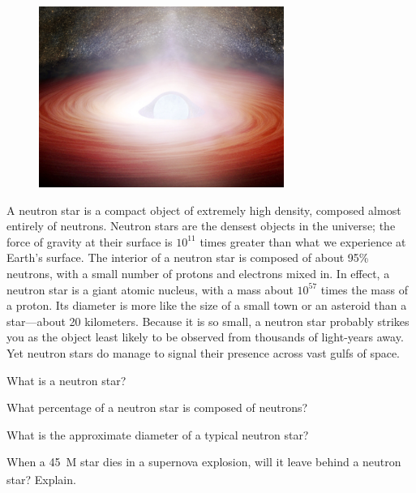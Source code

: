\documentclass{article}
\numberwithin{equation}{section}
\numberwithin{figure}{section}
\begin{document}
\begin{figure}[h!]
    \centering
    \includegraphics[width=8cm]{Figures/Neutron_Star_simulation.png}
\end{figure}

A \gls{neutron star} is a compact object of extremely high density, composed almost entirely of neutrons. Neutron stars are the densest objects in the universe; the force of gravity at their surface is $10^{11}$ times greater than what we experience at Earth's surface. The interior of a neutron star is composed of about 95\% neutrons, with a small number of protons and electrons mixed in. In effect, a neutron star is a giant atomic nucleus, with a mass about $10^{57}$ times the mass of a proton. Its diameter is more like the size of a small town or an asteroid than a star---about 20 kilometers. Because it is so small, a neutron star probably strikes you as the object least likely to be observed from thousands of light-years away. Yet neutron stars do manage to signal their presence across vast gulfs of space.
\vspace{1em}

\begin{exercise}  \label{SC9S9F}
    What is a neutron star?
\end{exercise}

\begin{exercise}
    What percentage of a neutron star is composed of neutrons?
\end{exercise}

\begin{exercise}
    What is the approximate diameter of a typical neutron star? 
\end{exercise}

\begin{exercise}
    When a \SI{45}{M_{\odot}} star dies in a supernova explosion, will it leave behind a neutron star? Explain. 
\end{exercise}
\end{document}

